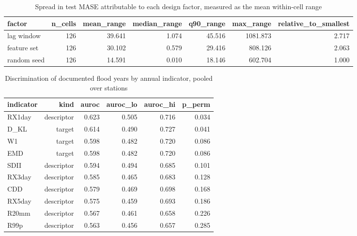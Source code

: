 \begin{table}[t]
\centering
\caption{Spread in test MASE attributable to each design factor, measured as the mean within-cell range}
\label{tab:factors}
\begin{tabular}{lrrrrrr}
\toprule
factor & n\_cells & mean\_range & median\_range & q90\_range & max\_range & relative\_to\_smallest \\
\midrule
lag window & 126 & 39.641 & 1.074 & 45.516 & 1081.873 & 2.717 \\
feature set & 126 & 30.102 & 0.579 & 29.416 & 808.126 & 2.063 \\
random seed & 126 & 14.591 & 0.010 & 18.146 & 602.704 & 1.000 \\
\bottomrule
\end{tabular}
\end{table}

\begin{table}[t]
\centering
\caption{Discrimination of documented flood years by annual indicator, pooled over stations}
\label{tab:proxy}
\begin{tabular}{lrrrrr}
\toprule
indicator & kind & auroc & auroc\_lo & auroc\_hi & p\_perm \\
\midrule
RX1day & descriptor & 0.623 & 0.505 & 0.716 & 0.034 \\
D\_KL & target & 0.614 & 0.490 & 0.727 & 0.041 \\
W1 & target & 0.598 & 0.482 & 0.720 & 0.086 \\
EMD & target & 0.598 & 0.482 & 0.720 & 0.086 \\
SDII & descriptor & 0.594 & 0.494 & 0.685 & 0.101 \\
RX3day & descriptor & 0.585 & 0.465 & 0.683 & 0.128 \\
CDD & descriptor & 0.579 & 0.469 & 0.698 & 0.168 \\
RX5day & descriptor & 0.575 & 0.459 & 0.693 & 0.186 \\
R20mm & descriptor & 0.567 & 0.461 & 0.658 & 0.226 \\
R99p & descriptor & 0.563 & 0.456 & 0.657 & 0.285 \\
\bottomrule
\end{tabular}
\end{table}

